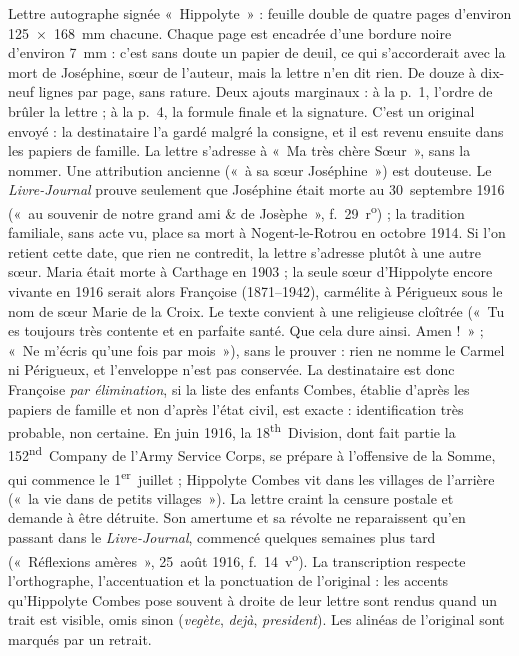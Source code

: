 Lettre autographe signée «~Hippolyte~» : feuille double de quatre pages d'environ 125~×~168~mm chacune. Chaque page est encadrée d'une bordure noire d'environ 7~mm : c'est sans doute un papier de deuil, ce qui s'accorderait avec la mort de Joséphine, sœur de l'auteur, mais la lettre n'en dit rien. De douze à dix-neuf lignes par page, sans rature. Deux ajouts marginaux : à la p.~1, l'ordre de brûler la lettre ; à la p.~4, la formule finale et la signature. C'est un original envoyé : la destinataire l'a gardé malgré la consigne, et il est revenu ensuite dans les papiers de famille. La lettre s'adresse à «~Ma très chère Sœur~», sans la nommer. Une attribution ancienne («~à sa sœur Joséphine~») est douteuse. Le \textit{Livre-Journal} prouve seulement que Joséphine était morte au 30~septembre 1916 («~au souvenir de notre grand ami \& de Josèphe~», f.~29~r\textsuperscript{o}) ; la tradition familiale, sans acte vu, place sa mort à Nogent-le-Rotrou en octobre 1914. Si l'on retient cette date, que rien ne contredit, la lettre s'adresse plutôt à une autre sœur. Maria était morte à Carthage en 1903 ; la seule sœur d'Hippolyte encore vivante en 1916 serait alors Françoise (1871--1942), carmélite à Périgueux sous le nom de sœur Marie de la Croix. Le texte convient à une religieuse cloîtrée («~Tu es toujours très contente et en parfaite santé. Que cela dure ainsi. Amen !~» ; «~Ne m'écris qu'une fois par mois~»), sans le prouver : rien ne nomme le Carmel ni Périgueux, et l'enveloppe n'est pas conservée. La destinataire est donc Françoise \textit{par élimination}, si la liste des enfants Combes, établie d'après les papiers de famille et non d'après l'état civil, est exacte : identification très probable, non certaine. En juin 1916, la 18\textsuperscript{th}~Division, dont fait partie la 152\textsuperscript{nd}~Company de l'Army Service Corps, se prépare à l'offensive de la Somme, qui commence le 1\textsuperscript{er}~juillet ; Hippolyte Combes vit dans les villages de l'arrière («~la vie dans de petits villages~»). La lettre craint la censure postale et demande à être détruite. Son amertume et sa révolte ne reparaissent qu'en passant dans le \textit{Livre-Journal}, commencé quelques semaines plus tard («~Réflexions amères~», 25~août 1916, f.~14~v\textsuperscript{o}). La transcription respecte l'orthographe, l'accentuation et la ponctuation de l'original : les accents qu'Hippolyte Combes pose souvent à droite de leur lettre sont rendus quand un trait est visible, omis sinon (\textit{vegète}, \textit{dejà}, \textit{president}). Les alinéas de l'original sont marqués par un retrait.

